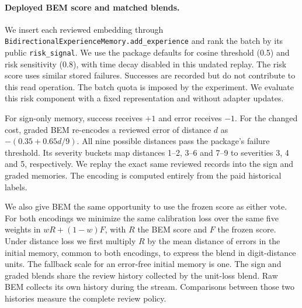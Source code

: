 \paragraph{Deployed BEM score and matched blends.}
We insert each reviewed embedding through
\texttt{BidirectionalExperienceMemory.add\_experience} and rank the batch by
its public \texttt{risk\_signal}. We use the package defaults for cosine
threshold (0.5) and risk sensitivity (0.8), with time decay disabled in
this undated replay. The risk score uses similar stored failures. Successes
are recorded but do not contribute to this read operation. The batch quota
is imposed by the experiment. We evaluate this risk component with a fixed
representation and without adapter updates.

For sign-only memory, success receives $+1$ and error receives $-1$.
For the changed cost, graded BEM re-encodes a reviewed error of distance $d$
as $-(0.35+0.65d/9)$. All nine possible distances pass the package's failure
threshold. Its severity buckets map distances 1--2, 3--6 and 7--9 to
severities 3, 4 and 5, respectively. We replay the exact same reviewed
records into the sign and graded memories. The encoding is computed entirely
from the paid historical labels.

We also give BEM the same opportunity to use the frozen score as either vote.
For both encodings we minimize the same calibration loss over the same five
weights in $wR+(1-w)F$, with $R$ the BEM score and $F$ the frozen score.
Under distance loss we first multiply $R$ by the mean distance of errors
in the initial memory, common to both encodings, to express the blend in
digit-distance units. The fallback scale for an error-free initial memory is
one. The sign and graded blends share the review history collected by the
unit-loss blend. Raw BEM collects its own history during the stream.
Comparisons between those two histories measure the complete review policy.

